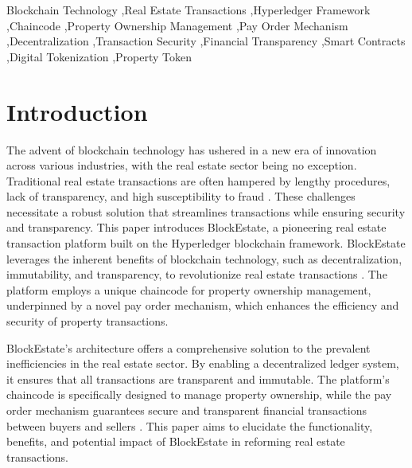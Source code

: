 \documentclass[3p,times]{elsarticle}
\begin{document}
\begin{frontmatter}
\begin{keyword}
Blockchain Technology \sep Real Estate Transactions \sep Hyperledger Framework \sep Chaincode \sep Property Ownership Management \sep Pay Order Mechanism \sep Decentralization \sep Transaction Security \sep Financial Transparency \sep Smart Contracts \sep Digital Tokenization \sep Property Token
\end{keyword}

\end{frontmatter}


\section{Introduction}

The advent of blockchain technology has ushered in a new era of innovation across various industries, with the real estate sector being no exception. Traditional real estate transactions are often hampered by lengthy procedures, lack of transparency, and high susceptibility to fraud \cite{saari2022blockchain}. These challenges necessitate a robust solution that streamlines transactions while ensuring security and transparency. This paper introduces BlockEstate, a pioneering real estate transaction platform built on the Hyperledger blockchain framework. BlockEstate leverages the inherent benefits of blockchain technology, such as decentralization, immutability, and transparency, to revolutionize real estate transactions \cite{garcia2020legal}. The platform employs a unique chaincode for property ownership management, underpinned by a novel pay order mechanism, which enhances the efficiency and security of property transactions.

BlockEstate’s architecture offers a comprehensive solution to the prevalent inefficiencies in the real estate sector. By enabling a decentralized ledger system, it ensures that all transactions are transparent and immutable. The platform’s chaincode is specifically designed to manage property ownership, while the pay order mechanism guarantees secure and transparent financial transactions between buyers and sellers \cite{ullah2023conceptual}. This paper aims to elucidate the functionality, benefits, and potential impact of BlockEstate in reforming real estate transactions.
\end{document}
